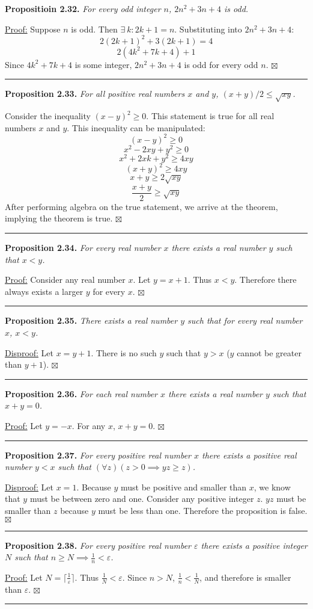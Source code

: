 \documentclass[a4paper,12pt]{article}
\newcommand{\entry}[3]
{
   \noindent\textbf{#1.}
   \emph{#2}
   \bigskip

   \noindent#3
   \bigskip
   \hrule
   \vspace{24pt}
}
\newcommand{\sig}{$\boxtimes$}
\begin{document}
\entry{Propositioin 2.32}
{For every odd integer $n$, $2n^2 + 3n + 4$ is odd.}
{
\underline{Proof:} Suppose $n$ is odd. Then $\exists~k : 2k + 1 = n$. Substituting into $2n^2 + 3n + 4$: \[ 2(2k + 1)^2 + 3(2k + 1) = 4 \] \[ 2(4k^2 + 7k + 4) + 1 \]
Since $4k^2 + 7k + 4$ is some integer, $2n^2 + 3n + 4$ is odd for every odd $n$. \sig
}



\entry{Proposition 2.33}
{For all positive real numbers $x$ and $y$, $(x + y) / 2 \leq \sqrt{xy}$.}
{
Consider the inequality $(x - y)^2 \geq 0$. This statement is true for all real numbers $x$ and $y$. This inequality can be manipulated: \[ (x - y)^2 \geq 0 \] \[ x^2 - 2xy + y^2 \geq 0 \] \[ x^2 + 2xk + y^2 \geq 4xy \] \[ (x + y)^2 \geq 4xy \] \[ x + y \geq 2\sqrt{xy} \] \[ \frac{x + y}{2} \geq \sqrt{xy} \]
After performing algebra on the true statement, we arrive at the theorem, implying the theorem is true. \sig
}



\entry{Proposition 2.34}
{For every real number $x$ there exists a real number $y$ such that $x < y$.}
{
\underline{Proof:} Consider any real number $x$. Let $y = x + 1$. Thus $x < y$. Therefore there always exists a larger $y$ for every $x$. \sig
}



\entry{Proposition 2.35}
{There exists a real number $y$ such that for every real number $x$, $x < y$.}
{
\underline{Disproof:}
Let $x = y + 1$. There is no such $y$ such that $y > x$ ($y$ cannot be greater than $y + 1$). \sig
}



\entry{Proposition 2.36}
{For each real number $x$ there exists a real number $y$ such that $x + y = 0$.}
{\underline{Proof:} Let $y = -x$. For any $x$, $x + y = 0$. \sig}



\entry{Proposition 2.37}
{For every positive real number $x$ there exists a positive real number $y < x$ such that $(\forall z)(z > 0 \implies yz \geq z)$.}
{
\underline{Disproof:} Let $x = 1$. Because $y$ must be positive and smaller than $x$, we know that $y$ must be between zero and one. Consider any positive integer $z$. $yz$ must be smaller than $z$ because $y$ must be less than one. Therefore the proposition is false. \sig
}



\entry{Proposition 2.38}
{For every positive real number $\varepsilon$ there exists a positive integer $N$ such that $n \geq N \implies \frac{1}{n} < \varepsilon$.}
{
\underline{Proof:} Let $N = \lceil \frac{1}{\varepsilon} \rceil$. Thus $\frac{1}{N} <  \varepsilon$. Since $n > N$, $\frac{1}{n} < \frac{1}{N}$, and therefore is smaller than  $\varepsilon$. \sig
}
\end{document}
